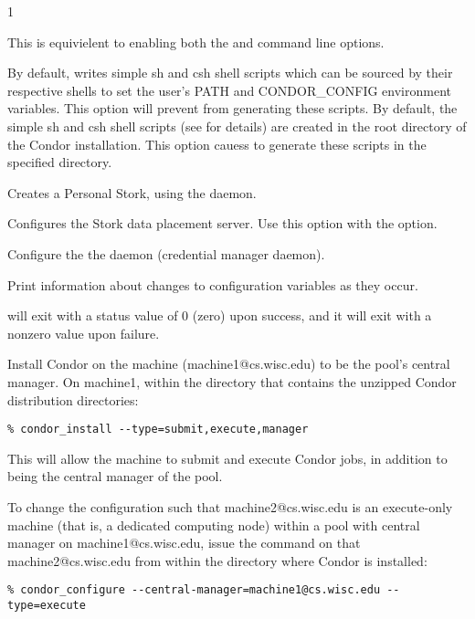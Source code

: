 \begin{ManPage}{\label{man-condor-configure}}{1}
\begin{Options}
	 {
	  This is equivielent to enabling both the  and
	   command line options.
	}

	 {
	  By default,  writes simple sh and csh
	  shell scripts which can be sourced by their respective
	  shells to set the user's PATH and CONDOR\_CONFIG environment
	  variables.  This option will prevent  from
	  generating these scripts.
	}
	 {
	  By default, the simple sh and csh shell scripts (see
	   for details) are created in 
	  the root directory of the Condor installation.  This option
	  cauess  to generate these scripts in the
	  specified directory.
	}

	 {Creates a 
	  Personal Stork, using the  daemon.}

	 {Configures the 
	  Stork data placement server.
	  Use this option with the  option.}

	 {Configure the
	  the  daemon (credential manager daemon).}

	 {Print information about changes
	to configuration variables as they occur.}
\end{Options}

\ExitStatus

 will exit with a status value of 0 (zero) upon success,
and it will exit with a nonzero value upon failure.

\Examples
Install Condor on the machine (machine1@cs.wisc.edu)
to be the pool's central manager.
On machine1,
within the directory that contains the unzipped Condor
distribution directories:
\footnotesize
\begin{verbatim}
% condor_install --type=submit,execute,manager
\end{verbatim}
\normalsize
This will allow the machine to submit and execute Condor jobs, 
in addition to being the central manager of the pool.


To change the configuration such that
machine2@cs.wisc.edu is an execute-only machine
(that is, a dedicated computing node)
within a pool with central manager on machine1@cs.wisc.edu,
issue the command on that machine2@cs.wisc.edu
from within the directory where Condor is installed:
\footnotesize
\begin{verbatim}
% condor_configure --central-manager=machine1@cs.wisc.edu --type=execute
\end{verbatim}
\normalsize




\end{ManPage}
